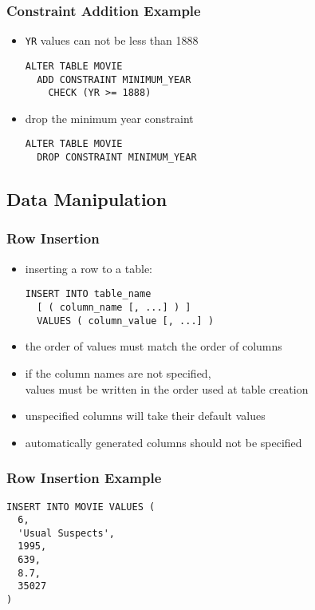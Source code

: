 \documentclass[dvipsnames]{beamer}
\theoremstyle{plain}
\begin{document}
\begin{frame}[fragile]
  \frametitle{Constraint Addition Example}

  \begin{itemize}
    \item \texttt{YR} values can not be less than 1888
    \begin{lstlisting}
ALTER TABLE MOVIE
  ADD CONSTRAINT MINIMUM_YEAR
    CHECK (YR >= 1888)
    \end{lstlisting}
  \end{itemize}

  \begin{itemize}
    \item drop the minimum year constraint
    \begin{lstlisting}
ALTER TABLE MOVIE
  DROP CONSTRAINT MINIMUM_YEAR
    \end{lstlisting}
  \end{itemize}
\end{frame}

\subsection{Data Manipulation}

\begin{frame}[fragile]
  \frametitle{Row Insertion}

  \begin{itemize}
    \item inserting a row to a table:
    \begin{lstlisting}
INSERT INTO table_name
  [ ( column_name [, ...] ) ]
  VALUES ( column_value [, ...] )
    \end{lstlisting}

    \pause
    \item the order of values must match the order of columns
    \item if the column names are not specified,\\
      values must be written in the order used at table creation

    \pause
    \item unspecified columns will take their default values
    \item automatically generated columns should not be specified
  \end{itemize}
\end{frame}

\begin{frame}[fragile]
  \frametitle{Row Insertion Example}

  \begin{lstlisting}
INSERT INTO MOVIE VALUES (
  6,
  'Usual Suspects',
  1995,
  639,
  8.7,
  35027
)
  \end{lstlisting}
\end{frame}
\end{document}
